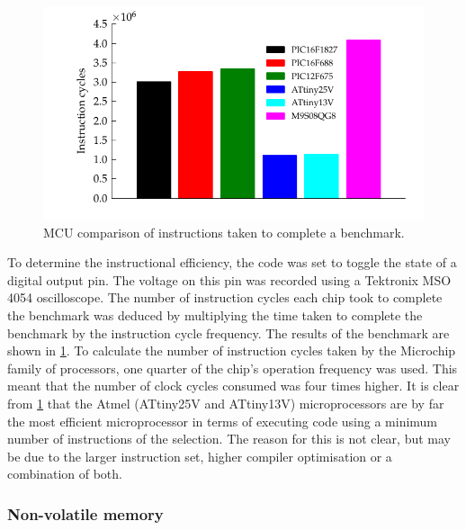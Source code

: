       \begin{figure}
          \begin{centering}
              \includegraphics{content/pt1/03-EnergyRequirements/graphics/Graph_All_Clock_Benchmark}
          \end{centering}
          \protect\caption{\label{fig:GraphBar_All_Benchmark}MCU comparison of instructions
          taken to complete a benchmark.}
      \end{figure}

      To determine the instructional efficiency, the code was set to toggle the state of a digital output pin.
      The voltage on this pin was recorded using a Tektronix MSO 4054 oscilloscope.
      The number of instruction cycles each chip took to complete the benchmark was deduced by multiplying the time taken to complete the benchmark by the instruction cycle frequency.
      The results of the benchmark are shown in \cref{fig:GraphBar_All_Benchmark}.
      To calculate the number of instruction cycles taken by the Microchip family of processors, one quarter of the chip's operation frequency was used.
      This meant that the number of clock cycles consumed was four times higher.
      It is clear from \cref{fig:GraphBar_All_Benchmark} that the Atmel (ATtiny25V and ATtiny13V) microprocessors are by far the most efficient microprocessor in terms of executing code using a minimum number of instructions of the selection.
      The reason for this is not clear, but may be due to the larger instruction set, higher compiler optimisation or a combination of both.



    \subsubsection{Non-volatile memory}

